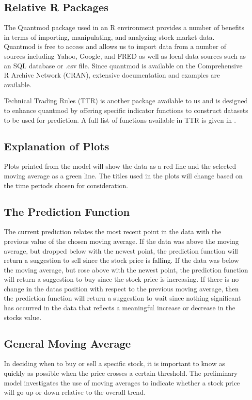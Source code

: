 \documentclass[11pt]{article}
\newcommand*\apos{\textsc{\char13}}
\begin{document}
\subsection*{Relative R Packages}\label{RRP}
The Quantmod package used in an R environment provides a number of benefits in terms of importing, manipulating, and analyzing stock market data. Quantmod is free to access and allows us to import data from a number of sources including Yahoo, Google, and FRED as well as local data sources such as an SQL database or .csv file. Since quantmod is available on the Comprehensive R Archive Network (CRAN), extensive documentation and examples are available.\textsuperscript{\cite{QMOD}}

Technical Trading Rules (TTR) is another package available to us and is designed to enhance quantmod by offering specific indicator functions to construct datasets to be used for prediction. A full list of functions available in TTR is given in \cite{TTR}. 

\subsection*{Explanation of Plots}\label{plots}
Plots printed from the model will show the data as a red line and the selected moving average as a green line. The titles used in the plots will change based on the time periods chosen for consideration.

\subsection*{The Prediction Function}\label{quant}
The current prediction relates the most recent point in the data with the previous value of the chosen moving average. If the data was above the moving average, but dropped below with the newest point, the prediction function will return a suggestion to sell since the stock price is falling. If the data was below the moving average, but rose above with the newest point, the prediction function will return a suggestion to buy since the stock price is increasing. If there is no change in the data\apos s position with respect to the previous moving average, then the prediction function will return a suggestion to wait since nothing significant has occurred in the data that reflects a meaningful increase or decrease in the stock\apos s value.

\subsection*{General Moving Average}\label{GMA}
In deciding when to buy or sell a specific stock, it is important to know as quickly as possible when the price crosses a certain threshold. The preliminary model investigates the use of moving averages to indicate whether a stock price will go up or down relative to the overall trend.
\end{document}
